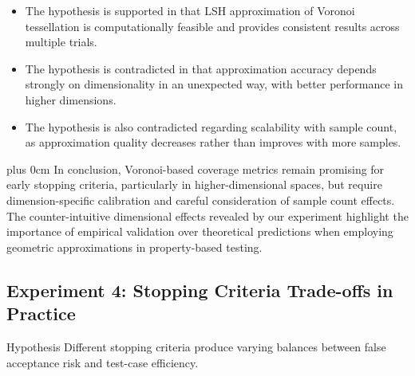 \documentclass[11pt,a4paper]{article}
\newcommand{\justifytext}{\leftskip=0pt \rightskip=0pt plus 0cm}
\begin{document}
\begin{itemize}
    \item The hypothesis is supported in that LSH approximation of Voronoi tessellation is computationally feasible and provides consistent results across multiple trials.
    
    \item The hypothesis is contradicted in that approximation accuracy depends strongly on dimensionality in an unexpected way, with better performance in higher dimensions.
    
    \item The hypothesis is also contradicted regarding scalability with sample count, as approximation quality decreases rather than improves with more samples.
\end{itemize}

\justifytext
In conclusion, Voronoi-based coverage metrics remain promising for early stopping criteria, particularly in higher-dimensional spaces, but require dimension-specific calibration and careful consideration of sample count effects. The counter-intuitive dimensional effects revealed by our experiment highlight the importance of empirical validation over theoretical predictions when employing geometric approximations in property-based testing.

\subsection{Experiment 4: Stopping Criteria Trade-offs in Practice}

\begin{theorembox}{Hypothesis}
Different stopping criteria produce varying balances between false acceptance risk and test-case efficiency.
\end{theorembox}
\end{document}

